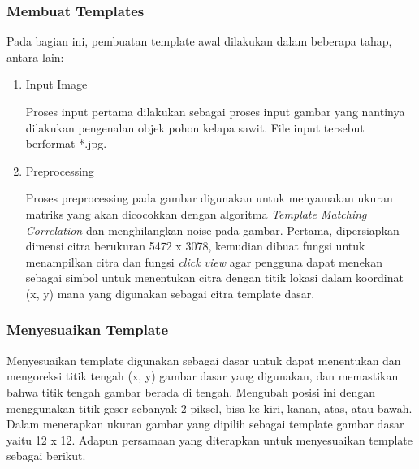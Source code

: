 \subsubsection{Membuat Templates}
\hspace{1,2cm}Pada bagian ini, pembuatan template awal dilakukan dalam beberapa tahap, antara lain:
\begin{enumerate}
	\item Input Image
	
	Proses input pertama dilakukan sebagai proses input gambar yang nantinya dilakukan pengenalan objek pohon kelapa sawit. File input tersebut berformat *.jpg.
	
	\item Preprocessing
	
	Proses preprocessing pada gambar digunakan untuk menyamakan ukuran matriks yang akan dicocokkan dengan algoritma \textit{Template Matching Correlation} dan menghilangkan noise pada gambar.
	Pertama, dipersiapkan dimensi citra berukuran 5472 x 3078, kemudian dibuat fungsi untuk menampilkan citra dan fungsi \textit{click view} agar pengguna dapat menekan sebagai simbol untuk menentukan citra dengan titik lokasi dalam koordinat (x, y) mana yang digunakan sebagai citra template dasar.
	
\end{enumerate}

\subsubsection{Menyesuaikan Template}
\hspace{1,2cm}Menyesuaikan template digunakan sebagai dasar untuk dapat menentukan dan mengoreksi titik tengah (x, y) gambar dasar yang digunakan, dan memastikan bahwa titik tengah gambar berada di tengah. Mengubah posisi ini dengan menggunakan titik geser sebanyak 2 piksel, bisa ke kiri, kanan, atas, atau bawah. Dalam menerapkan ukuran gambar yang dipilih sebagai template gambar dasar yaitu 12 x 12. Adapun persamaan yang diterapkan untuk menyesuaikan template sebagai berikut.

